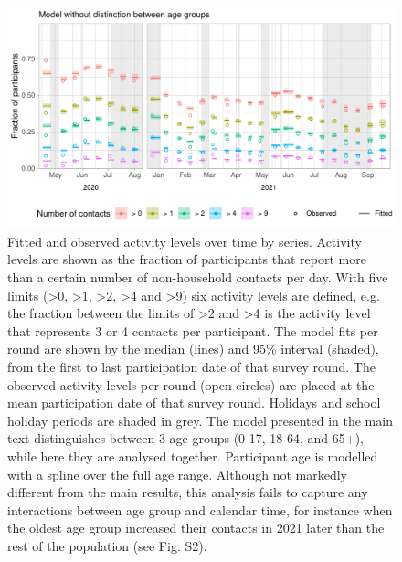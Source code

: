 \documentclass[fleqn,10pt]{wlscirep}
\begin{document}
\begin{figure}[ht]
\centering
\includegraphics[width=\linewidth]{../figures/fit_studypopulation_series.pdf}
\caption{Fitted and observed activity levels over time by series. Activity levels are shown as the fraction of participants that report more than a certain number of non-household contacts per day. With five limits (>0, >1, >2, >4 and >9) six activity levels are defined, e.g. the fraction between the limits of >2 and >4 is the activity level that represents 3 or 4 contacts per participant. The model fits per round are shown by the median (lines) and 95\% interval (shaded), from the first to last participation date of that survey round. The observed activity levels per round (open circles) are placed at the mean participation date of that survey round. Holidays and school holiday periods are shaded in grey. The model presented in the main text distinguishes between 3 age groups (0-17, 18-64, and 65+), while here they are analysed together. Participant age is modelled with a spline over the full age range. Although not markedly different from the main results, this analysis fails to capture any interactions between age group and calendar time, for instance when the oldest age group increased their contacts in 2021 later than the rest of the population (see Fig. S2).}
\label{fig:agedep}
\end{figure}
\end{document}
